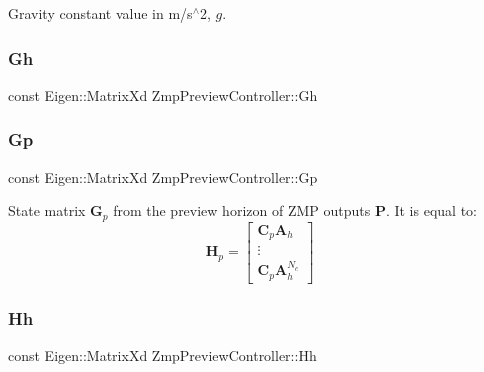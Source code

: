 Gravity constant value in m/s$^\wedge$2, $ g $. \hypertarget{classZmpPreviewController_a9429cb06fdd2c3ca5036a2fd48303632}{}\label{classZmpPreviewController_a9429cb06fdd2c3ca5036a2fd48303632} 
\subsubsection{\texorpdfstring{Gh}{Gh}}
{\footnotesize\ttfamily const Eigen\+::\+Matrix\+Xd Zmp\+Preview\+Controller\+::\+Gh\hspace{0.3cm}{\ttfamily [private]}}

\hypertarget{classZmpPreviewController_a53a7d8af5be4a5d5cea99fad2ea48979}{}\label{classZmpPreviewController_a53a7d8af5be4a5d5cea99fad2ea48979} 
\subsubsection{\texorpdfstring{Gp}{Gp}}
{\footnotesize\ttfamily const Eigen\+::\+Matrix\+Xd Zmp\+Preview\+Controller\+::\+Gp\hspace{0.3cm}{\ttfamily [private]}}

State matrix $\mathbf{G}_p$ from the preview horizon of Z\+MP outputs $\mathbf{P}$. It is equal to\+: \[ \mathbf{H}_p = \left[\begin{array}{c} \mathbf{C}_p\mathbf{A}_h \\ \vdots \\ \mathbf{C}_p\mathbf{A}^{N_c}_h \end{array}\right] \] \hypertarget{classZmpPreviewController_a8caaf8bf8f06e5b0b53d2cd5c131eefd}{}\label{classZmpPreviewController_a8caaf8bf8f06e5b0b53d2cd5c131eefd} 
\subsubsection{\texorpdfstring{Hh}{Hh}}
{\footnotesize\ttfamily const Eigen\+::\+Matrix\+Xd Zmp\+Preview\+Controller\+::\+Hh\hspace{0.3cm}{\ttfamily [private]}}

\hypertarget{classZmpPreviewController_a32ab17a3be30490e4a1e874bf3581843}{}\label{classZmpPreviewController_a32ab17a3be30490e4a1e874bf3581843} 
